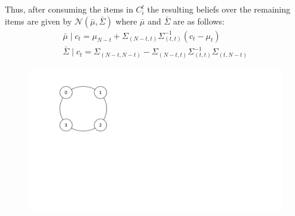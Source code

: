 \documentclass[format=acmsmall, review=false]{acmart}
\begin{document}
Thus, after consuming the items in $C_{i}^{t}$ the resulting beliefs over the remaining items are given by $\mathcal{N}(\bar{\mu}, \bar{\Sigma})$ where $\bar{\mu}$ and $\bar{\Sigma}$ are as follows:
\begin{align*}
\bar{\mu} \mid c_t = \mu_{N-t} + \Sigma_{(N-t,t)} \Sigma_{(t,t)}^{-1}(c_t - \mu_t) \\
\bar{\Sigma} \mid c_t = \Sigma_{(N-t,N-t)} - \Sigma_{(N-t,t)} \Sigma_{(t,t)}^{-1} \Sigma_{(t,N-t)}
\end{align*}
\begin{figure}[t]
\includegraphics[width=.3\linewidth]{figures/Example-Bubbles.pdf}
\label{fig:illustrative_example}
\end{figure}
\end{document}
